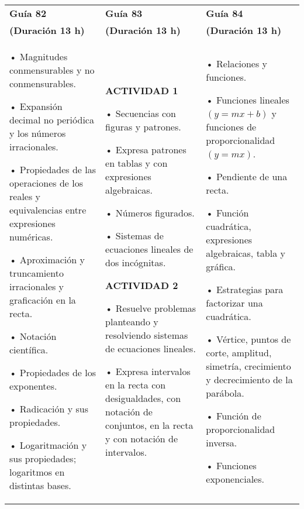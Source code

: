 \documentclass[12pt,a4paper]{article}
\begin{document}
\begin{table}[h]
\centering
\small
\begin{tabular}{|p{4cm}|p{4cm}|p{4cm}|}
\hline
\rowcolor{fondoazul}
\textbf{Guía 82} & \textbf{Guía 83} & \textbf{Guía 84} \\
\textbf{(Duración 13 h)} & \textbf{(Duración 13 h)} & \textbf{(Duración 13 h)} \\
\hline
• Magnitudes conmensurables y no conmensurables.

• Expansión decimal no periódica y los números irracionales.

• Propiedades de las operaciones de los reales y equivalencias entre expresiones numéricas.

• Aproximación y truncamiento irracionales y graficación en la recta.

• Notación científica.

• Propiedades de los exponentes.

• Radicación y sus propiedades.

• Logaritmación y sus propiedades; logaritmos en distintas bases.
&
\textbf{ACTIVIDAD 1}

• Secuencias con figuras y patrones.

• Expresa patrones en tablas y con expresiones algebraicas.

• Números figurados.

• Sistemas de ecuaciones lineales de dos incógnitas.

\textbf{ACTIVIDAD 2}

• Resuelve problemas planteando y resolviendo sistemas de ecuaciones lineales.

• Expresa intervalos en la recta con desigualdades, con notación de conjuntos, en la recta y con notación de intervalos.
&
• Relaciones y funciones.

• Funciones lineales $(y=mx+b)$ y funciones de proporcionalidad $(y=mx)$.

• Pendiente de una recta.

• Función cuadrática, expresiones algebraicas, tabla y gráfica.

• Estrategias para factorizar una cuadrática.

• Vértice, puntos de corte, amplitud, simetría, crecimiento y decrecimiento de la parábola.

• Función de proporcionalidad inversa.

• Funciones exponenciales. \\
\hline
\end{tabular}
\end{table}
\end{document}
